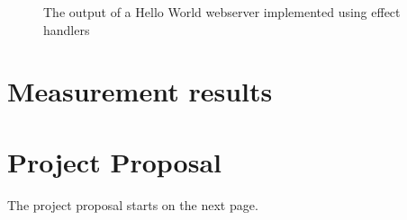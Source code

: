 \documentclass[%
    12pt,
    bibliography=toc,
    listof=leveldown,%
    oneside
]{book}
\begin{document}
\begin{appendices}
\begin{figure}
    \caption{The output of a Hello World webserver implemented using effect handlers}
    \label{fig:app-screenshot-webserver-hello-world}

\end{figure}

\chapter{Measurement results}

\chapter{Project Proposal}
\setcounter{page}{1}
The project proposal starts on the next page.
%

\end{appendices}
\end{document}
